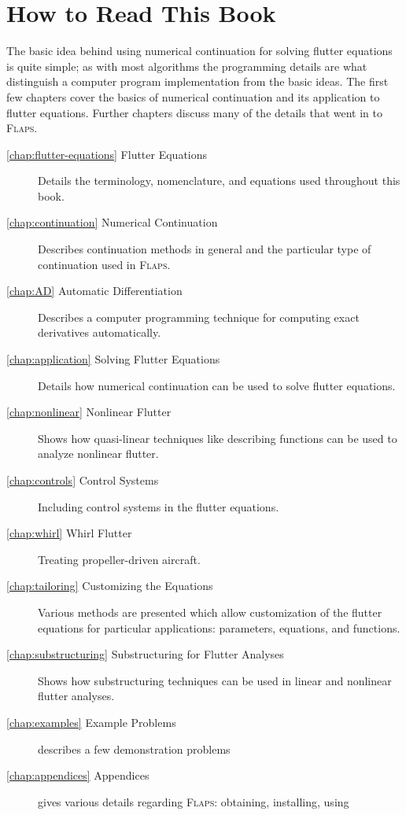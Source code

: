 \documentclass[10pt,openany,twoside]{book}
\numberwithin{equation}{section}   %
\newcommand{\Flaps}{{\normalfont\scshape Flaps\:}}
\begin{document}
\section{How to Read This Book}
The basic idea behind using numerical continuation for solving flutter
equations is quite simple; as with most algorithms the programming details
are  what distinguish a computer program implementation from the basic
ideas. The first few chapters cover the basics of numerical continuation
and its application to flutter equations. Further chapters discuss
many of the details that went in to \Flaps.

\begin{description}
	\item[\ref{chap:flutter-equations} Flutter Equations]
	Details the terminology, nomenclature, and equations used
	throughout this book.

	\item[\ref{chap:continuation} Numerical Continuation]
	Describes continuation methods in general and the particular type
	of continuation used in \Flaps.

	\item[\ref{chap:AD} Automatic Differentiation]
	Describes a computer programming technique for computing exact derivatives
	automatically.

	\item[\ref{chap:application} Solving Flutter Equations]
	Details how numerical continuation can be used to solve flutter equations.

	\item[\ref{chap:nonlinear} Nonlinear Flutter]
	Shows how quasi-linear techniques like describing functions
	can be used to analyze nonlinear flutter.

	\item[\ref{chap:controls} Control Systems] Including control systems in
			the flutter equations.

	\item[\ref{chap:whirl} Whirl Flutter] Treating propeller-driven aircraft.

	\item[\ref{chap:tailoring} Customizing the Equations]
	Various methods are presented which allow customization of the
	flutter equations for particular applications: parameters, equations,
	and functions.

	\item[\ref{chap:substructuring} Substructuring for Flutter Analyses]
	Shows how substructuring techniques can be used in linear and nonlinear
	flutter analyses.

	\item[\ref{chap:examples} Example Problems] describes a few demonstration problems

	\item[\ref{chap:appendices} Appendices] gives various details
		regarding \Flaps: obtaining, installing, using
                
\end{description}
\end{document}
